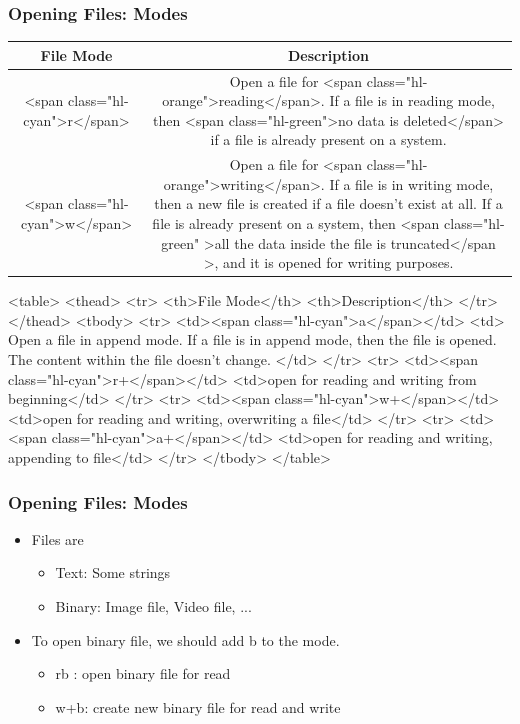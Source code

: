 \documentclass{../c-lecture}
\begin{document}
\begin{frame}
  \frametitle{Opening Files: Modes}
  \begin{table}
  \begin{tabularx}{\textwidth}{cc}
    \toprule
    File Mode &
    Description \\
    \midrule
    <span class="hl-cyan">r</span> &
    Open a file for <span class="hl-orange">reading</span>. If a file is
    in reading mode, then
    <span class="hl-green">no data is deleted</span> if a file is
    already present on a system.\\
    \midrule
    <span class="hl-cyan">w</span> &
    Open a file for <span class="hl-orange">writing</span>. If a file is
    in writing mode, then a new file is created if a file doesn't exist
    at all. If a file is already present on a system, then
    <span class="hl-green"
      >all the data inside the file is truncated</span
    >, and it is opened for writing purposes.\\
    \bottomrule
  \end{tabularx}
  \end{table}
\end{frame}

\begin{frame}
  <table>
    <thead>
      <tr>
        <th>File Mode</th>
        <th>Description</th>
      </tr>
    </thead>
    <tbody>
      <tr>
        <td><span class="hl-cyan">a</span></td>
        <td>
          Open a file in append mode. If a file is in append mode, then the
          file is opened. The content within the file doesn't change.
        </td>
      </tr>
      <tr>
        <td><span class="hl-cyan">r+</span></td>
        <td>open for reading and writing from beginning</td>
      </tr>
      <tr>
        <td><span class="hl-cyan">w+</span></td>
        <td>open for reading and writing, overwriting a file</td>
      </tr>
      <tr>
        <td><span class="hl-cyan">a+</span></td>
        <td>open for reading and writing, appending to file</td>
      </tr>
    </tbody>
  </table>
\end{frame}

\begin{frame}
  \frametitle{Opening Files: Modes}
  \begin{itemize}
    \item Files are
    \begin{itemize}
      \item Text: Some strings
      \item Binary: Image file, Video file, ...
    \end{itemize}
    \item To open binary file, we should add b to the mode.
    \begin{itemize}
      \item rb : open binary file for read
      \item w+b: create new binary file for read and write
    \end{itemize}
  \end{itemize}
\end{frame}
\end{document}
